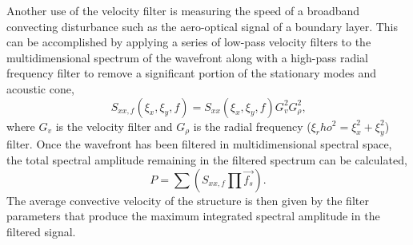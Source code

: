 Another use of the velocity filter is measuring the speed of a broadband convecting disturbance such as the aero-optical signal of a boundary layer.
This can be accomplished by applying a series of low-pass velocity filters to the multidimensional spectrum of the wavefront along with a high-pass radial frequency filter to remove a significant portion of the stationary modes and acoustic cone,
\begin{equation}
  S_{xx,f}(\xi_x,\xi_y,f) = S_{xx}(\xi_x,\xi_y,f) G_v^2 G_\rho^2 \textrm{,}
  \label{eqn:06_velocity_filter_measurement}
\end{equation}
where $G_v$ is the velocity filter and $G_\rho$ is the radial frequency ($\xi_rho^2 = \xi_x^2+\xi_y^2$) filter.
Once the wavefront has been filtered in multidimensional spectral space, the total spectral amplitude remaining in the filtered spectrum can be calculated,
\begin{equation}
  P = \sum (S_{xx,f}\prod{\overrightarrow{f_s}}) \textrm{.}
\end{equation}
The average convective velocity of the structure is then given by the filter parameters that produce the maximum integrated spectral amplitude in the filtered signal.

